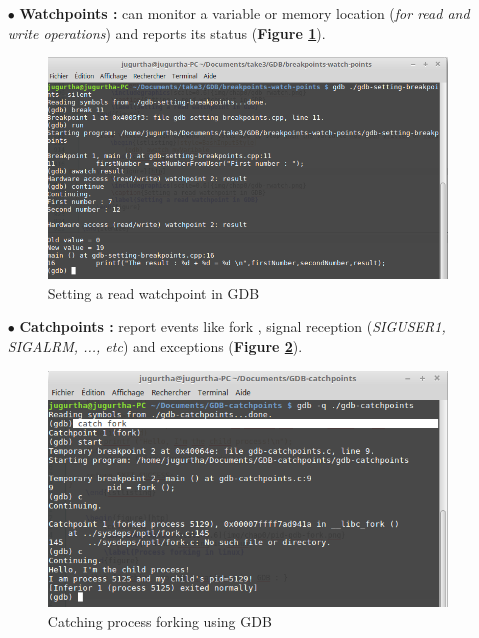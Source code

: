 \begin{itemize}
\begin{itemize}
\item[$\bullet$] \textbf{Watchpoints : } can monitor a variable or memory location (\textit{for read and write operations}) and reports its status (\textbf{Figure \ref{Setting a read watchpoint in GDB}}).
\begin{figure}[H]
		\centering
        \includegraphics[scale=0.32]{img/solution/gdb-awatch.png}
        \caption{Setting a read watchpoint in GDB}
        \label{Setting a read watchpoint in GDB}
    \end{figure}
    
    
\item[$\bullet$] \textbf{Catchpoints : } report events like fork , signal reception (\textit{SIGUSER1, SIGALRM, ..., etc}) and exceptions (\textbf{Figure \ref{Catching process forking using GDB}}).
\begin{figure}[H]
		\centering
        \includegraphics[scale=0.32]{img/solution/gdb-fork-got-catch.png}
        \caption{Catching process forking using GDB}
        \label{Catching process forking using GDB}
    \end{figure}
    



\end{itemize}
\end{itemize}
